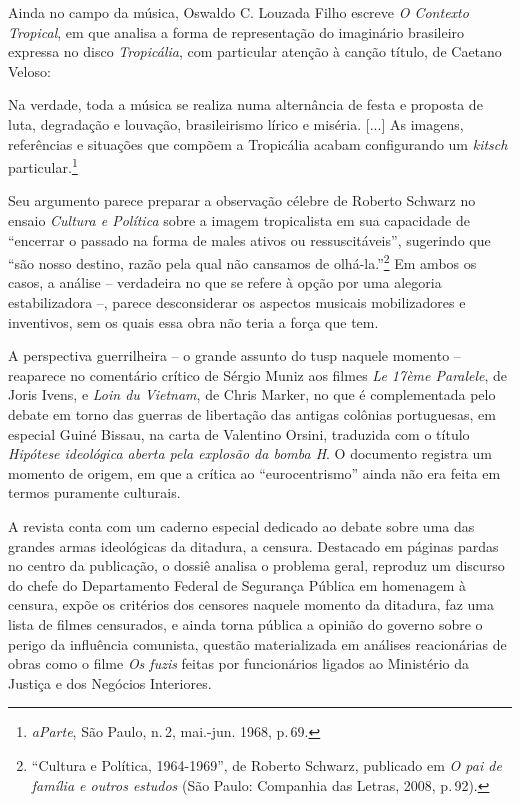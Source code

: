 Ainda no campo da música, Oswaldo C. Louzada Filho escreve {\it O
Contexto Tropical}, em que analisa a forma de representação do
imaginário brasileiro expressa no disco {\it Tropicália}, com particular
atenção à canção título, de Caetano Veloso:

\startblockquote
Na verdade, toda a música se realiza numa alternância de festa e
proposta de luta, degradação e louvação, brasileirismo lírico e miséria.
{[}...{]} As imagens, referências e situações que compõem a Tropicália
acabam configurando um {\it kitsch} particular.\footnote{{\it aParte},
  São Paulo, n.\,2, mai.-jun. 1968, p.\,69.}
\stopblockquote

Seu argumento parece preparar a observação célebre de Roberto Schwarz no
ensaio {\it Cultura e Política} sobre a imagem tropicalista em sua
capacidade de “encerrar o passado na forma de males ativos ou
ressuscitáveis”, sugerindo que “são nosso destino, razão pela qual não
cansamos de olhá-la.”\footnote{“Cultura e Política, 1964-1969”, de
  Roberto Schwarz, publicado em {\it O pai de família e outros estudos}
  (São Paulo: Companhia das Letras, 2008, p.\,92).} Em ambos os casos, a
análise -- verdadeira no que se refere à opção por uma alegoria
estabilizadora --, parece desconsiderar os aspectos musicais
mobilizadores e inventivos, sem os quais essa obra não teria a força que
tem.

A perspectiva guerrilheira -- o grande assunto do {\sc tusp} naquele momento --
reaparece no comentário crítico de Sérgio Muniz aos filmes {\it Le 17ème
Paralele}, de Joris Ivens, e {\it Loin du Vietnam}, de Chris Marker, no
que é complementada pelo debate em torno das guerras de libertação das
antigas colônias portuguesas, em especial Guiné Bissau, na carta de
Valentino Orsini, traduzida com o título {\it Hipótese ideológica aberta
pela explosão da bomba H}. O documento registra um momento de origem, em
que a crítica ao “eurocentrismo” ainda não era feita em termos puramente
culturais.

A revista conta com um caderno especial dedicado ao debate sobre uma das
grandes armas ideológicas da ditadura, a censura. Destacado em páginas
pardas no centro da publicação, o dossiê analisa o problema geral,
reproduz um discurso do chefe do Departamento Federal de Segurança
Pública em homenagem à censura, expõe os critérios dos censores naquele
momento da ditadura, faz uma lista de filmes censurados, e ainda torna
pública a opinião do governo sobre o perigo da influência comunista,
questão materializada em análises reacionárias de obras como o filme
{\it Os fuzis} feitas por funcionários ligados ao Ministério da Justiça
e dos Negócios Interiores.

